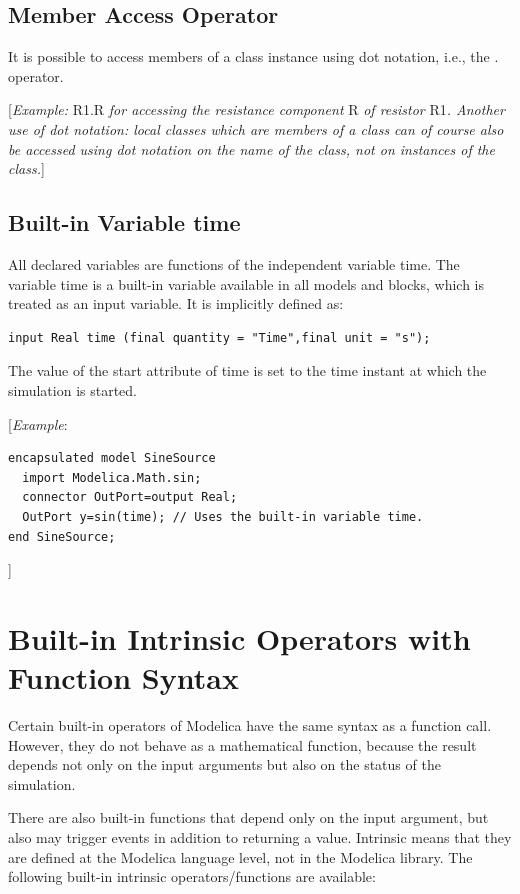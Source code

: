\documentclass[10pt,a4paper]{report}
\def\doublelabel#1{\label{#1}}
\begin{document}
\subsection{Member Access Operator}\doublelabel{member-access-operator}

It is possible to access members of a class instance using dot notation,
i.e., the . operator.

{[}\emph{Example:} R1.R \emph{for accessing the resistance component} R
\emph{of resistor} R1\emph{. Another use of dot notation: local classes
which are members of a class can of course also be accessed using dot
notation on the name of the class, not on instances of the class.}{]}

\subsection{Built-in Variable time}\doublelabel{built-in-variable-time}

All declared variables are functions of the independent variable time.
The variable time is a built-in variable available in all models and
blocks, which is treated as an input variable. It is implicitly defined
as:
\begin{lstlisting}[language=modelica]
input Real time (final quantity = "Time",final unit = "s");
\end{lstlisting}

The value of the start attribute of time is set to the time instant at
which the simulation is started.

{[}\emph{Example}:
\begin{lstlisting}[language=modelica]
encapsulated model SineSource
  import Modelica.Math.sin;
  connector OutPort=output Real;
  OutPort y=sin(time); // Uses the built-in variable time.
end SineSource;
\end{lstlisting}
{]}

\section{Built-in Intrinsic Operators with Function Syntax}\doublelabel{built-in-intrinsic-operators-with-function-syntax}

Certain built-in operators of Modelica have the same syntax as a
function call. However, they do not behave as a mathematical function,
because the result depends not only on the input arguments but also on
the status of the simulation.

There are also built-in functions that depend only on the input
argument, but also may trigger events in addition to returning a value.
Intrinsic means that they are defined at the Modelica language level,
not in the Modelica library. The following built-in intrinsic
operators/functions are available:
\end{document}
